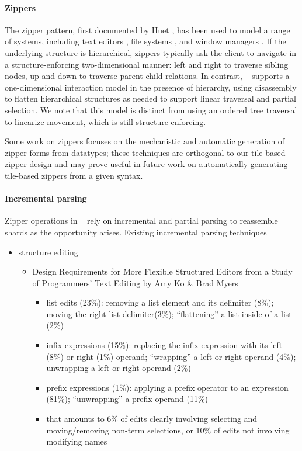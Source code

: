 \paragraph{Zippers}
The zipper pattern, first documented by Huet
\cite{zipper}, has been used to model a range of systems,
including text editors \cite{lazy-functional-incremental-parsing},
file systems \cite{zipper-fs}, and window managers \cite{window-manager}.
If the underlying structure is hierarchical,
zippers typically ask the client to navigate
in a structure-enforcing two-dimensional manner: left and right to traverse
sibling nodes, up and down to traverse parent-child relations.
In contrast, \ty~ supports a one-dimensional interaction model
in the presence of hierarchy, using disassembly to flatten
hierarchical structures as needed to support linear traversal
and partial selection.
We note that this model is distinct from using an ordered tree
traversal to linearize movement, which is still structure-enforcing.

Some work on zippers focuses on the mechanistic \cite{derivative-zippers,clowns-jokers}
and automatic \cite{syz} generation of zipper forms
from datatypes;
these techniques are orthogonal to our tile-based zipper design
and may prove useful in future work on
automatically generating tile-based zippers
from a given syntax.

\paragraph{Incremental parsing}
Zipper operations in \ty~ rely on incremental and partial
parsing to reassemble shards as the opportunity arises.
Existing incremental parsing techniques


\begin{itemize}
  \item structure editing
  \begin{itemize}
    \item Design Requirements for More Flexible Structured Editors from a Study of Programmers' Text Editing
      by Amy Ko \& Brad Myers
    \begin{itemize}
        \item list edits (23\%):
          removing a list element and its delimiter (8\%);
          moving the right list delimiter(3\%);
          ``flattening'' a list inside of a list (2\%)
        \item infix expressions (15\%):
            replacing the infix expression with its left (8\%) or right (1\%) operand;
            ``wrapping'' a left or right operand (4\%);
            unwrapping a left or right operand (2\%)
        \item prefix expressions (1\%):
            applying a prefix operator to an expression (81\%);
            ``unwrapping'' a prefix operand (11\%)
        \item that amounts to 6\% of edits clearly involving selecting and
          moving/removing non-term selections, or 10\% of edits not involving
          modifying names
    \end{itemize}
  \end{itemize}
\end{itemize}